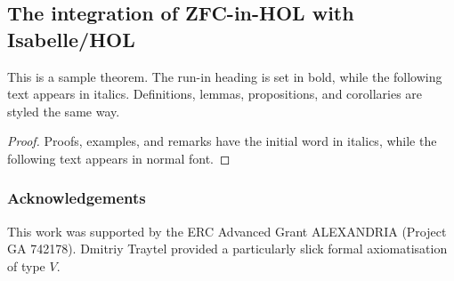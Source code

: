 \documentclass[runningheads]{llncs}
\begin{document}
\subsection{The integration of ZFC-in-HOL with Isabelle/HOL}

\newpage


\begin{theorem}
This is a sample theorem. The run-in heading is set in bold, while
the following text appears in italics. Definitions, lemmas,
propositions, and corollaries are styled the same way.
\end{theorem}
%
%
\begin{proof}
Proofs, examples, and remarks have the initial word in italics,
while the following text appears in normal font.
\end{proof}


\subsubsection{Acknowledgements} 
This work was supported by the ERC Advanced Grant ALEXANDRIA (Project GA 742178). 
Dmitriy Traytel provided a particularly slick formal axiomatisation of type $V$.  



\end{document}
